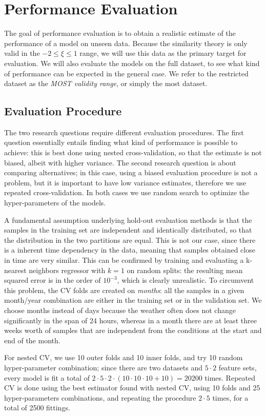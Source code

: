 \documentclass[a4paper,11pt]{kth-mag}
\begin{document}
\section{Performance Evaluation}
\label{sec:perf_eval}
The goal of performance evaluation is to obtain a realistic estimate of the performance of a model on unseen data. Because the similarity theory is only valid in the $-2\leq\xi\leq1$ range, we will use this data as the primary target for evaluation. We will also evaluate the models on the full dataset, to see what kind of performance can be expected in the general case. We refer to the restricted dataset as the \emph{MOST validity range}, or simply the most dataset.

\subsection{Evaluation Procedure}
The two research questions require different evaluation procedures. The first question essentially entails finding what kind of performance is possible to achieve: this is best done using nested cross-validation, so that the estimate is not biased, albeit with higher variance. The second research question is about comparing alternatives; in this case, using a biased evaluation procedure is not a problem, but it is important to have low variance estimates, therefore we use repeated cross-validation. In both cases we use random search \citep{random_search} to optimize the hyper-parameters of the models.

A fundamental assumption underlying hold-out evaluation methods is that the samples in the training set are independent and identically distributed, so that the distribution in the two partitions are equal. This is not our case, since there is a inherent time dependency in the data, meaning that samples obtained close in time are very similar. This can be confirmed by training and evaluating a k-nearest neighbors regressor with $k=1$ on random splits: the resulting mean squared error is in the order of $10^{-3}$, which is clearly unrealistic. To circumvent this problem, the CV folds are created on \emph{months}: all the samples in a given month/year combination are either in the training set or in the validation set. We choose months instead of days because the weather often does not change significantly in the span of 24 hours, whereas in a month there are at least three weeks worth of samples that are independent from the conditions at the start and end of the month.

For nested CV, we use 10 outer folds and 10 inner folds, and try 10 random hyper-parameter combination; since there are two datasets and $5\cdot2$ feature sets, every model is fit a total of $2\cdot5\cdot2\cdot(10\cdot10\cdot10+10)=20200$ times. Repeated CV is done using the best estimator found with nested CV, using 10 folds and 25 hyper-parameters combinations, and repeating the procedure $2\cdot5$ times, for a total of 2500 fittings.
\end{document}
